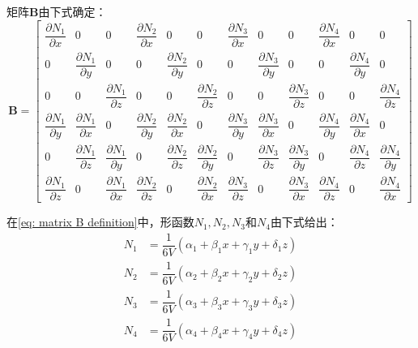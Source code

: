 \begin{CJK*}{UTF8}{song}
矩阵$ \mathbf{B} $由下式确定：
\setcounter{MaxMatrixCols}{20}
\begin{equation} \label{eq: matrix B definition}
\mathbf{B} = \begin{bmatrix}
\dfrac{\partial N_1}{\partial x} & 0 & 0 & \dfrac{\partial N_2}{\partial x} & 0 & 0 & \dfrac{\partial N_3}{\partial x} & 0 & 0 & \dfrac{\partial N_4}{\partial x} & 0 & 0 \\ 
0 & \dfrac{\partial N_1}{\partial y} & 0 & 0 & \dfrac{\partial N_2}{\partial y} & 0 & 0 & \dfrac{\partial N_3}{\partial y} & 0 & 0 & \dfrac{\partial N_4}{\partial y} & 0 \\ 
0 & 0 & \dfrac{\partial N_1}{\partial z} & 0 & 0 & \dfrac{\partial N_2}{\partial z} & 0 & 0 & \dfrac{\partial N_3}{\partial z} & 0 & 0 & \dfrac{\partial N_4}{\partial z} \\ 
\dfrac{\partial N_1}{\partial y} & \dfrac{\partial N_1}{\partial x} & 0 & \dfrac{\partial N_2}{\partial y} & \dfrac{\partial N_2}{\partial x} & 0 & \dfrac{\partial N_3}{\partial y} & \dfrac{\partial N_3}{\partial x} & 0 & \dfrac{\partial N_4}{\partial y} & \dfrac{\partial N_4}{\partial x} & 0 \\ 
0 & \dfrac{\partial N_1}{\partial z} & \dfrac{\partial N_1}{\partial y} & 0 & \dfrac{\partial N_2}{\partial z} & \dfrac{\partial N_2}{\partial y} & 0 & \dfrac{\partial N_3}{\partial z} & \dfrac{\partial N_3}{\partial y} & 0 & \dfrac{\partial N_4}{\partial z} & \dfrac{\partial N_4}{\partial y} \\ 
\dfrac{\partial N_1}{\partial z} & 0 & \dfrac{\partial N_1}{\partial x} & \dfrac{\partial N_2}{\partial z} & 0 & \dfrac{\partial N_2}{\partial x} & \dfrac{\partial N_3}{\partial z} & 0 & \dfrac{\partial N_3}{\partial x} & \dfrac{\partial N_4}{\partial z} & 0 & \dfrac{\partial N_4}{\partial x}
\end{bmatrix} 
\end{equation}

在\cref{eq: matrix B definition}中，形函数$ N_1, N_2, N_3 $和$ N_4 $由下式给出：
\begin{align}
N_1 &= \dfrac{1}{6V} (\alpha_1 + \beta_1 x + \gamma_1 y + \delta_1 z)\\
N_2 &= \dfrac{1}{6V} (\alpha_2 + \beta_2 x + \gamma_2 y + \delta_2 z)\\
N_3 &= \dfrac{1}{6V} (\alpha_3 + \beta_3 x + \gamma_3 y + \delta_3 z)\\
N_4 &= \dfrac{1}{6V} (\alpha_4 + \beta_4 x + \gamma_4 y + \delta_4 z)
\end{align}


\end{CJK*}
